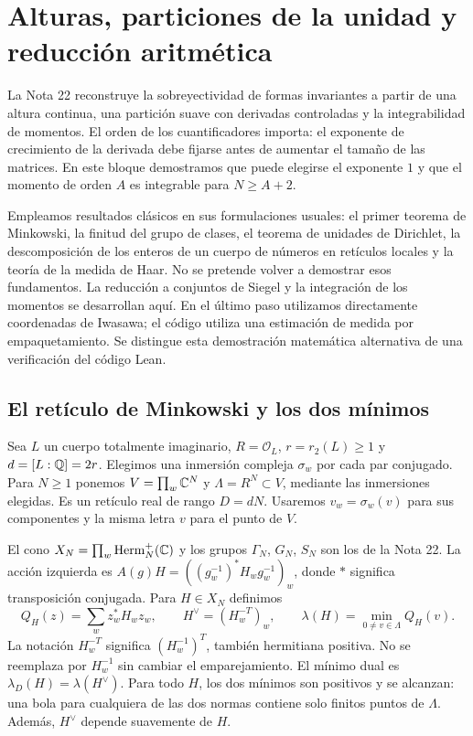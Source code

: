 \section{Alturas, particiones de la unidad y reducción aritmética}
\label{sec:alturas-reduccion}

La Nota 22 reconstruye la sobreyectividad de formas invariantes a partir de una altura continua, una partición suave con derivadas controladas y la integrabilidad de momentos. El orden de los cuantificadores importa: el exponente de crecimiento de la derivada debe fijarse antes de aumentar el tamaño de las matrices. En este bloque demostramos que puede elegirse el exponente $1$ y que el momento de orden $A$ es integrable para $N\ge A+2$.

Empleamos resultados clásicos en sus formulaciones usuales: el primer teorema de Minkowski, la finitud del grupo de clases, el teorema de unidades de Dirichlet, la descomposición de los enteros de un cuerpo de números en retículos locales y la teoría de la medida de Haar. No se pretende volver a demostrar esos fundamentos. La reducción a conjuntos de Siegel y la integración de los momentos se desarrollan aquí. En el último paso utilizamos directamente coordenadas de Iwasawa; el código utiliza una estimación de medida por empaquetamiento. Se distingue esta demostración matemática alternativa de una verificación del código Lean.

\subsection{El retículo de Minkowski y los dos mínimos}

Sea $L$ un cuerpo totalmente imaginario, $R=\mathcal O_L$, $r=r_2(L)\ge1$ y $d=[L:\mathbb{Q}]=2r$. Elegimos una inmersión compleja $\sigma_w$ por cada par conjugado. Para $N\ge1$ ponemos $V=\prod_w\mathbb{C}^N$ y $\Lambda=R^N\subset V$, mediante las inmersiones elegidas. Es un retículo real de rango $D=dN$. Usaremos $v_w=\sigma_w(v)$ para sus componentes y la misma letra $v$ para el punto de $V$.

El cono $X_N=\prod_w\operatorname{Herm}_N^+(\mathbb{C})$ y los grupos $\Gamma_N$, $G_N$, $S_N$ son los de la Nota 22. La acción izquierda es $A(g)H=((g_w^{-1})^*H_wg_w^{-1})_w$, donde $*$ significa transposición conjugada. Para $H\in X_N$ definimos
\begin{equation}
 Q_H(z)=\sum_w z_w^*H_w z_w,\qquad H^\vee=(H_w^{-T})_w,
 \qquad \lambda(H)=\min_{0\ne v\in\Lambda}Q_H(v).
 \label{eq:ahr-q}
\end{equation}
La notación $H_w^{-T}$ significa $(H_w^{-1})^T$, también hermitiana positiva. No se reemplaza por $H_w^{-1}$ sin cambiar el emparejamiento. El mínimo dual es $\lambda_D(H)=\lambda(H^\vee)$. Para todo $H$, los dos mínimos son positivos y se alcanzan: una bola para cualquiera de las dos normas contiene solo finitos puntos de $\Lambda$. Además, $H^\vee$ depende suavemente de $H$.

